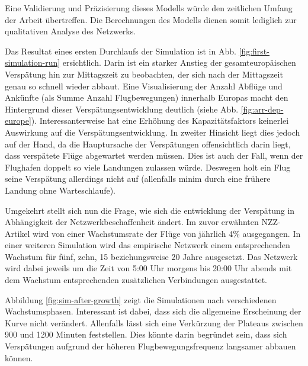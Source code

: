 Eine Validierung und Präzisierung dieses Modells würde den zeitlichen Umfang der Arbeit übertreffen.
Die Berechnungen des Modells dienen somit lediglich zur qualitativen Analyse des Netzwerks.

Das Resultat eines ersten Durchlaufs der Simulation ist in Abb. \ref{fig:first-simulation-run} ersichtlich.
Darin ist ein starker Anstieg der gesamteuropäischen Verspätung hin zur Mittagszeit zu beobachten, der sich nach der
Mittagszeit genau so schnell wieder abbaut.
Eine Visualisierung der Anzahl Abflüge und Ankünfte (als Summe Anzahl Flugbewegungen) innerhalb Europas macht den
Hintergrund dieser Verspätungsentwicklung deutlich (siehe Abb. \ref{fig:arr-dep-europe}).
Interessanterweise hat eine Erhöhung des Kapazitätsfaktors keinerlei Auswirkung auf die Verspätungsentwicklung.
In zweiter Hinsicht liegt dies jedoch auf der Hand, da die Hauptursache der Verspätungen offensichtlich darin liegt, dass
verspätete Flüge abgewartet werden müssen.
Dies ist auch der Fall, wenn der Flughafen doppelt so viele Landungen zulassen würde.
Deswegen holt ein Flug seine Verspätung allerdings nicht auf (allenfalls minim durch eine frühere Landung ohne Warteschlaufe).

Umgekehrt stellt sich nun die Frage, wie sich die entwicklung der Verspätung in Abhängigkeit der Netzwerkbeschaffenheit ändert.
Im zuvor erwähnten NZZ-Artikel wird von einer Wachstumsrate der Flüge von jährlich 4\% ausgegangen.
In einer weiteren Simulation wird das empirische Netzwerk einem entsprechenden Wachstum für fünf, zehn, 15 beziehungsweise 20 Jahre ausgesetzt.
Das Netzwerk wird dabei jeweils um die Zeit von 5:00 Uhr morgens bis 20:00 Uhr abends mit dem Wachstum entsprechenden zusätzlichen Verbindungen ausgestattet.

Abbildung \ref{fig:sim-after-growth} zeigt die Simulationen nach verschiedenen Wachstumsphasen.
Interessant ist dabei, dass sich die allgemeine Erscheinung der Kurve nicht verändert.
Allenfalls lässt sich eine Verkürzung der Plateaus zwischen 900 und 1200 Minuten feststellen.
Dies könnte darin begründet sein, dass sich Verspätungen aufgrund der höheren Flugbewegungsfrequenz langsamer abbauen
können.

